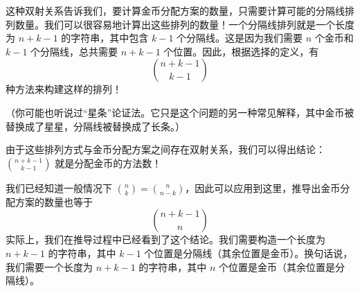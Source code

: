 这种双射关系告诉我们，要计算金币分配方案的数量，只需要计算可能的分隔线排列数量。我们可以很容易地计算出这些排列的数量！一个分隔线排列就是一个长度为 $n + k - 1$ 的字符串，其中包含 $k - 1$ 个分隔线。这是因为我们需要 $n$ 个金币和 $k - 1$ 个分隔线，总共需要 $n + k - 1$ 个位置。因此，根据选择的定义，有
\[{n+k-1 \choose k-1}\]
种方法来构建这样的排列！

（你可能也听说过``星条''论证法。它只是这个问题的另一种常见解释，其中金币被替换成了星星，分隔线被替换成了长条。）

由于这些排列方式与金币分配方案之间存在双射关系，我们可以得出结论：${n+k-1 \choose k-1}$ 就是分配金币的方法数！

我们已经知道一般情况下 ${n \choose k} = {n \choose n-k}$，因此可以应用到这里，推导出金币分配方案的数量也等于
\[{n+k-1 \choose n}\]
实际上，我们在推导过程中已经看到了这个结论。我们需要构造一个长度为 $n+k-1$ 的字符串，其中 $k-1$ 个位置是分隔线（其余位置是金币）。换句话说，我们需要一个长度为 $n+k-1$ 的字符串，其中 $n$ 个位置是金币（其余位置是分隔线）。

